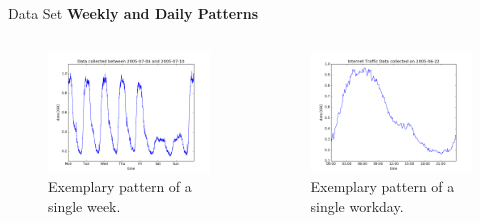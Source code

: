 \documentclass{beamer}
\begin{document}
  \begin{frame}{Data Set}   
    \textbf{Weekly and Daily Patterns}
    \begin{columns}[c]
      \begin{figure}
       \includegraphics[width=1.05\textwidth]{images/traffic_over_week.png}
       \caption{Exemplary pattern of a single week.}
      \end{figure}

        \begin{figure}
         \includegraphics[width=1.05\textwidth]{images/traffic_over_day.png}
         \caption{Exemplary pattern of a single workday.}
        \end{figure}
    \end{columns}
  \end{frame}  
  
\end{document}
